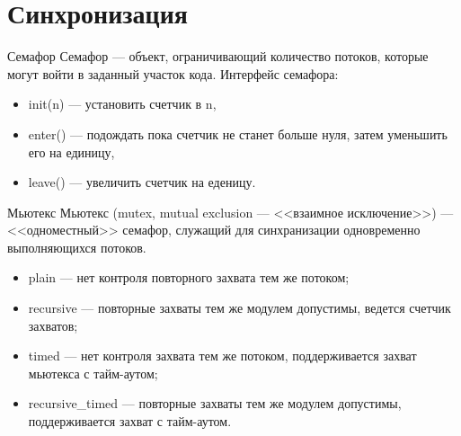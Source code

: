 \section{Синхронизация}

\begin{frame}{Семафор}
Семафор --- объект, ограничивающий количество потоков, которые могут войти в заданный участок кода.
\vfill
Интерфейс семафора:
\begin{itemize}
    \item init(n) --- установить счетчик в n,
    \item enter() --- подождать пока счетчик не станет больше нуля, затем уменьшить его на единицу,
    \item leave() --- увеличить счетчик на еденицу.
\end{itemize}
\end{frame}

\begin{frame}{Мьютекс}
Мьютекс (\abbr mutex, mutual exclusion --- <<взаимное исключение>>) --- <<одноместный>> семафор, служащий для синхранизации одновременно выполняющихся потоков.
\vfill
\begin{itemize}
    \item plain --- нет контроля повторного захвата тем же потоком;
    \item recursive --- повторные захваты тем же модулем допустимы, ведется
    счетчик захватов;
    \item timed --- нет контроля захвата тем же потоком, поддерживается захват
    мьютекса с тайм-аутом;
    \item recursive\_timed --- повторные захваты тем же модулем допустимы,
    поддерживается захват с тайм-аутом.
\end{itemize}
\end{frame}

